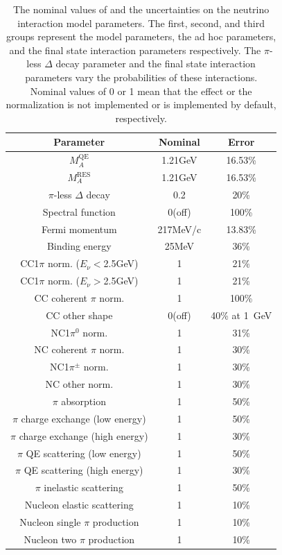 \documentclass[%
 reprint,
superscriptaddress,
 amsmath,amssymb,
 aps,
]{revtex4-1}
\begin{document}
\begin{table}[htbp]
\begin{center}
\caption{The nominal values of and the uncertainties on the neutrino interaction model parameters. The first, second, and third groups represent the model parameters, the ad hoc parameters, and the final state interaction parameters respectively. The $\pi$-less $\Delta$ decay parameter and the final state interaction parameters vary the probabilities of these interactions. Nominal values of 0 or 1 mean that the effect or the normalization is not implemented or is implemented by default, respectively.}
\begin{tabular}{ccc} \hline \hline
Parameter &  Nominal & Error\\ \hline
$M_A^{\mathrm{QE}}$	&	1.21GeV	&	16.53\%	\\
$M_A^{\mathrm{RES}}$	&	1.21GeV	&	16.53\%	\\
$\pi$-less $\Delta$ decay &0.2 & 20\%\\
Spectral function	&	0(off)	&	100\%	\\
Fermi momentum &	217MeV/c	&	13.83\%	\\
Binding energy &	25MeV	&	36\%	\\
\hline
CC1$\pi$ norm.  ($E_{\nu}<$2.5GeV)	&	1	&	21\%	\\
CC1$\pi$ norm.  ($E_{\nu}>$2.5GeV)	&	1	&	21\%	\\
CC coherent $\pi$ norm.	&	1	&	100\%	\\
CC other shape	&	0(off)	&	40\% at 1~GeV\\
NC1$\pi^0$ norm.	&	1	&	31\%	\\
NC coherent $\pi$ norm.	&	1	&	30\%	\\
NC1$\pi^{\pm}$ norm.	&	1	&	30\%	\\
NC other norm.	&	1	&	30\%	\\
\hline
$\pi$ absorption	&	1	&	50\%	\\
$\pi$ charge exchange (low energy)	&	1	&	50\%	\\
$\pi$ charge exchange (high energy)	&	1	&	30\%	\\
$\pi$ QE scattering (low energy)	&	1	&	50\%	\\
$\pi$ QE scattering (high energy)	&	1	&	30\%	\\
$\pi$ inelastic scattering	&	1	&	50\%	\\
Nucleon elastic scattering & 1 & 10\% \\
Nucleon single $\pi$ production & 1 & 10\% \\
Nucleon two $\pi$ production & 1 & 10\% \\
\hline \hline
\end{tabular}
\label{int_par_uncertainty}
  \end{center}
\end{table}
\end{document}
